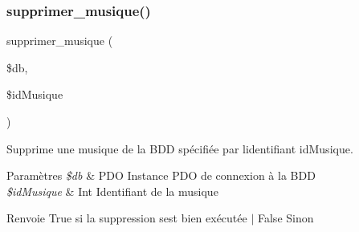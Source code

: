 \subsubsection{\texorpdfstring{supprimer\+\_\+musique()}{supprimer\_musique()}}
{\footnotesize\ttfamily supprimer\+\_\+musique (\begin{DoxyParamCaption}\item[{}]{\$db,  }\item[{}]{\$id\+Musique }\end{DoxyParamCaption})}



Supprime une musique de la B\+DD spécifiée par l\textquotesingle{}identifiant \textquotesingle{}id\+Musique\textquotesingle{}. 


\begin{DoxyParams}{Paramètres}
{\em \$db} & P\+DO Instance P\+DO de connexion à la B\+DD \\
\hline
{\em \$id\+Musique} & Int Identifiant de la musique \\
\hline
\end{DoxyParams}
\begin{DoxyReturn}{Renvoie}
True si la suppression s\textquotesingle{}est bien exécutée $\vert$ False Sinon 
\end{DoxyReturn}

